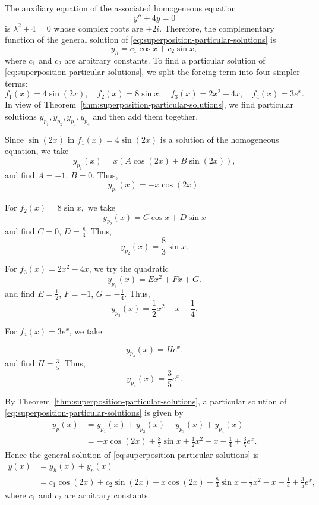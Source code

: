 \begin{solution}
	The auxiliary equation of the associated homogeneous equation \[y''+4y=0\] is $\lambda^2 +4=0$ whose complex roots are $\pm 2i.$ Therefore, the complementary function of the general solution of \eqref{eq:superposition-particular-solutions} is
	\[y_h = c_1\cos x + c_2 \sin x,\] where $c_1$ and $c_2$ are arbitrary constants. To find a particular solution of \eqref{eq:superposition-particular-solutions}, we split the forcing  term into four simpler terms:
	\[f_1(x)=4\sin(2x), \quad f_2(x)=8\sin x,\quad f_3(x)=2x^2-4x,\quad f_4(x)=3e^x.\]
	In view of Theorem~\ref{thm:superposition-particular-solutions}, 
	we find particular solutions $y_{p_1},y_{p_2},y_{p_3},y_{p_4}$  and then add them together.
			
	
			
			Since $\sin(2x)$ in $f_1(x)= 4\sin(2x)$ is a solution of the homogeneous equation, we take 
			\[
			y_{p_1}(x) = x(A\cos(2x) + B\sin(2x)),
			\] and find  $A=-1$, $B=0$. Thus, 
			\[
			\boxed{y_{p_1}(x) = -x \cos(2x).}
			\]
			
			 For $f_2(x) =8 \sin x,$
		we take
			\[
			y_{p_2}(x) = C \cos x + D \sin x
			\] and find  $C=0$, $D=\frac{8}{3}.$ Thus,
			\[
			\boxed{y_{p_2}(x) = \frac{8}{3} \sin x.}
			\]
			
		 For $ f_3(x)= 2x^2-4x$, we  try the quadratic
			\[
			y_{p_3}(x) = E x^2 + F x + G.
			\]
		and find $E=\frac12$, $F=-1$, $G=-\frac14.$ Thus,
			\[
			\boxed{y_{p_3}(x) = \frac12 x^2 - x - \frac14.}
			\]
			
		 For $f_4(x)=3 e^x$, we take
			
			\[
			y_{p_4}(x) = H e^x.
			\]
		and find $H = \frac{3}{5}.$ Thus, 
			\[
			\boxed{y_{p_4}(x) = \frac{3}{5} e^x.}
			\]
			
		 By Theorem~\ref{thm:superposition-particular-solutions}, a particular solution of \eqref{eq:superposition-particular-solutions} is given by
			\begin{align*}
				y_p (x)&= y_{p_1}(x) + y_{p_2}(x) + y_{p_3}(x) + y_{p_4}(x) \\
				&= -x \cos(2x) + \frac{8}{3} \sin x + \frac12 x^2 - x - \frac14 + \frac{3}{5} e^x.
			\end{align*}
		Hence the general solution of \eqref{eq:superposition-particular-solutions}  is
			\begin{align*}
				y(x) &= y_h(x) + y_p(x) \\
				&= c_1 \cos(2x) + c_2 \sin(2x)
				- x \cos(2x) + \frac{8}{3} \sin x + \frac12 x^2 - x - \frac14 + \frac{3}{5} e^x,
			\end{align*}
			where $c_1$ and $c_2$ are arbitrary constants.
\end{solution}


